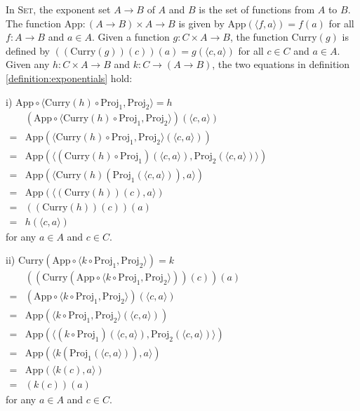 In \textsc{Set}, the exponent set $ A \to B $ of $ A $ and $ B $ is the set of functions from $ A $ to $ B $. The function $ \text{App} : (A \to B) \times A \to B $ is given by $ \text{App}( \langle f,a \rangle ) = f(a) $ for all $ f: A \to B $ and $ a \in A $. Given a function $ g: C \times A \to B $, the function $ \text{Curry}(g) $ is defined by $ ((\text{Curry}(g))(c))(a) = g( \langle c,a \rangle ) $ for all $ c \in C $ and $ a \in A $. Given any $ h: C \times A \to B $ and $ k: C \to (A \to B) $, the two equations in definition \ref{definition:exponentials} hold:
\begin{myitemize}
\item[i)] $ \text{App} \circ \langle \text{Curry} (h) \circ \text{Proj}_1 , \text{Proj}_2 \rangle = h $\\
$
\begin{array}{ll}
  & ( \text{App} \circ \langle \text{Curry} (h) \circ \text{Proj}_1 , \text{Proj}_2 \rangle )( \langle c,a \rangle )\\
= & \text{App}( \langle \text{Curry} (h) \circ \text{Proj}_1 , \text{Proj}_2 \rangle ( \langle c,a \rangle ) ) \\
= & \text{App}( \langle ( \text{Curry} (h) \circ \text{Proj}_1 ) ( \langle c,a \rangle ) , \text{Proj}_2 ( \langle c,a \rangle ) \rangle ) \\
= & \text{App}( \langle \text{Curry} (h) ( \text{Proj}_1 ( \langle c,a \rangle ) ), a \rangle ) \\
= & \text{App}( \langle ( \text{Curry} (h) )(c) , a \rangle ) \\
= & (( \text{Curry} (h) )(c))(a) \\
= & h( \langle c,a \rangle )
\end{array}
$\\
for any $ a \in A $ and $ c \in C $.
\item[ii)] $ \text{Curry} ( \text{App} \circ \langle k \circ \text{Proj}_1 , \text{Proj}_2 \rangle ) = k $\\
$
\begin{array}{ll}
  & (( \text{Curry} ( \text{App} \circ \langle k \circ \text{Proj}_1 , \text{Proj}_2 \rangle ))(c))(a)\\
= & ( \text{App} \circ \langle k \circ \text{Proj}_1 , \text{Proj}_2 \rangle )( \langle c,a \rangle ) \\
= & \text{App} ( \langle k \circ \text{Proj}_1 , \text{Proj}_2 \rangle ( \langle c,a \rangle ) ) \\
= & \text{App} ( \langle ( k \circ \text{Proj}_1 ) ( \langle c,a \rangle ) , \text{Proj}_2 ( \langle c,a \rangle ) \rangle ) \\
= & \text{App} ( \langle k ( \text{Proj}_1 ( \langle c,a \rangle ) ) , a \rangle ) \\
= & \text{App} ( \langle k (c) , a \rangle ) \\
= & (k(c))(a)
\end{array}
$\\
for any $ a \in A $ and $ c \in C $.
\end{myitemize}



